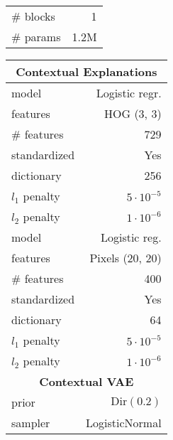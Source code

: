 \documentclass[twoside,11pt]{article}
\begin{document}
\begin{table}[t!]
\begin{subtable}[t]{.52\textwidth}
\begin{tabular}[t]{@{}c|l|r@{}}
    \midrule
    \multicolumn{2}{l}{\# blocks}       & 1                     \\
    \multicolumn{2}{l}{\# params}       & 1.2M                  \\
    \bottomrule
\end{tabular}\hspace{2pt}\setlength\tabcolsep{2pt}
\begin{tabular}[t]{@{}l|r@{}}
    \toprule
    \multicolumn{2}{c}{\textbf{Contextual Explanations}}        \\
    \midrule
    model                               & Logistic regr.        \\
    features                            & HOG (3, 3)            \\
    \# features                         & 729                   \\
    standardized                        & Yes                   \\
    dictionary                          & 256                   \\
    $l_1$ penalty                       & $5 \cdot 10^{-5}$     \\
    $l_2$ penalty                       & $1 \cdot 10^{-6}$     \\
    \midrule
    model                               & Logistic reg.         \\
    features                            & Pixels (20, 20)       \\
    \# features                         & 400                   \\
    standardized                        & Yes                   \\
    dictionary                          & 64                    \\
    $l_1$ penalty                       & $5 \cdot 10^{-5}$     \\
    $l_2$ penalty                       & $1 \cdot 10^{-6}$     \\
    \midrule[.75pt]
    \multicolumn{2}{c}{\textbf{Contextual VAE}}                 \\
    \midrule
    prior                               & $\mathrm{Dir}(0.2)$   \\
    sampler                             & LogisticNormal        \\
    \bottomrule
\end{tabular}
\end{subtable}\begin{subtable}[t]{.49\textwidth}

\end{subtable}
\end{table}
\end{document}

